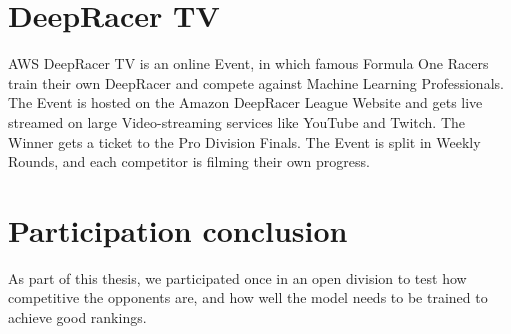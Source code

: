 \section{DeepRacer TV}
AWS DeepRacer TV is an online Event, in which famous Formula One Racers train their own DeepRacer and compete against Machine Learning Professionals. The Event is hosted on the Amazon DeepRacer League Website and gets live streamed on large Video-streaming services like YouTube and Twitch. The Winner gets a ticket to the Pro Division Finals. The Event is split in Weekly Rounds, and each competitor is filming their own progress. 

\section{Participation conclusion}
As part of this thesis, we participated once in an open division to test how competitive the opponents are, and how well the model needs to be trained to achieve good rankings.  

